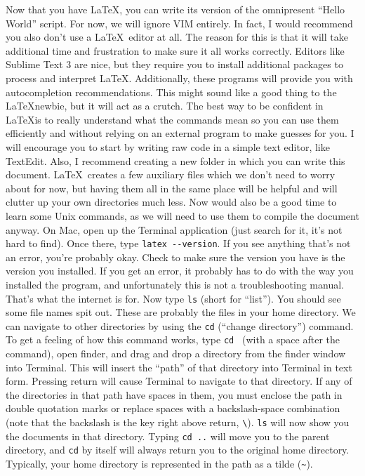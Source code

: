 \documentclass[a4paper, 12pt, twoside]{book}
\begin{document}
Now that you have \LaTeX, you can write its version of the omnipresent ``Hello World'' script. For now, we will ignore VIM entirely. In fact, I would recommend you also don't use a \LaTeX\ editor at all. The reason for this is that it will take additional time and frustration to make sure it all works correctly. Editors like Sublime Text 3 are nice, but they require you to install additional packages to process and interpret \LaTeX. Additionally, these programs will provide you with autocompletion recommendations. This might sound like a good thing to the \LaTeX newbie, but it will act as a crutch. The best way to be confident in \LaTeX is to really understand what the commands mean so you can use them efficiently and without relying on an external program to make guesses for you. I will encourage you to start by writing raw code in a simple text editor, like TextEdit. Also, I recommend creating a new folder in which you can write this document. \LaTeX\ creates a few auxiliary files which we don't need to worry about for now, but having them all in the same place will be helpful and will clutter up your own directories much less. Now would also be a good time to learn some Unix commands, as we will need to use them to compile the document anyway. On Mac, open up the Terminal application (just search for it, it's not hard to find). Once there, type \verb+latex --version+. If you see anything that's not an error, you're probably okay. Check to make sure the version you have is the version you installed. If you get an error, it probably has to do with the way you installed the program, and unfortunately this is not a troubleshooting manual. That's what the internet is for. Now type \verb+ls+ (short for ``list''). You should see some file names spit out. These are probably the files in your home directory. We can navigate to other directories by using the \verb+cd+ (``change directory'') command. To get a feeling of how this command works, type \verb+cd + (with a space after the command), open finder, and drag and drop a directory from the finder window into Terminal. This will insert the ``path'' of that directory into Terminal in text form. Pressing return will cause Terminal to navigate to that directory. If any of the directories in that path have spaces in them, you must enclose the path in double quotation marks or replace spaces with a backslash-space combination (note that the backslash is the key right above return, \verb+\+). \verb+ls+ will now show you the documents in that directory. Typing \verb+cd ..+ will move you to the parent directory, and \verb+cd+ by itself will always return you to the original home directory. Typically, your home directory is represented in the path as a tilde (\verb+~+).
\end{document}
